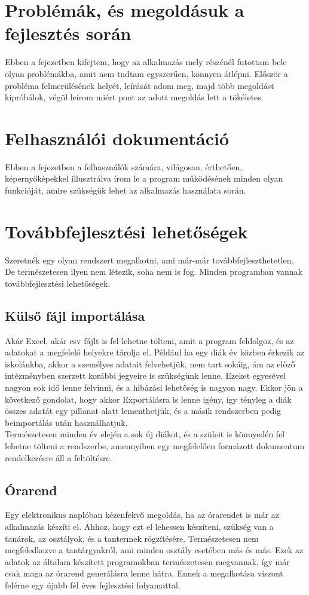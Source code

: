 \documentclass[
]{thesis-ekf}
\begin{document}
\chapter{Problémák, és megoldásuk a fejlesztés során}
Ebben a fejezetben kifejtem, hogy az alkalmazás mely részénél futottam bele olyan problémákba, amit nem tudtam egyszerűen, könnyen átlépni. Először a probléma felmerülésének helyét, leírását adom meg, majd több megoldást kipróbálok, végül leírom miért pont az adott megoldás lett a tökéletes.
\chapter{Felhasználói dokumentáció}
Ebben a fejezetben a felhasználók számára, világosan, érthetően, képernyőképekkel illusztrálva írom le a program működésének minden olyan funkcióját, amire szükségük lehet az alkalmazás használata során.
\chapter{Továbbfejlesztési lehetőségek}
Szeretnék egy olyan rendszert megalkotni, ami már-már továbbfejleszthetetlen. De természetesen ilyen nem létezik, soha nem is fog. Minden programban vannak továbbfejlesztési lehetőségek.
\section{Külső fájl importálása}
Akár Excel, akár csv fájlt is fel lehetne tölteni, amit a program feldolgoz, és az adatokat a megfelelő helyekre tárolja el. Például ha egy diák év közben érkezik az iskolánkba, akkor a személyes adatait felvehetjük, nem tart sokáig, ám az előző intézményben szerzett korábbi jegyeire is szükségünk lenne. Ezeket egyesével nagyon sok idő lenne felvinni, és a hibázási lehetőség is nagyon nagy. Ekkor jön a következő gondolat, hogy akkor Exportálásra is lenne igény, így tényleg a diák összes adatát egy pillanat alatt lementhetjük, és a másik rendszerben pedig beimportálás után használhatjuk.\\
Természetesen minden év elején a sok új diákot, és a szüleit is könnyedén fel lehetne tölteni a rendszerbe, amennyiben egy megfelelően formázott dokumentum rendelkezésre áll a feltöltésre.
\section{Órarend}
Egy elektronikus naplóban kézenfekvő megoldás, ha az órarendet is már az alkalmazás készíti el. Ahhoz, hogy ezt el lehessen készíteni, szükség van a tanárok, az osztályok, és a tantermek rögzítésére. Természetesen nem megfeledkezve a tantárgyakról, ami minden osztály esetében más és más. Ezek az adatok az általam készített programokban természetesen megvannak, így már csak maga az órarend generálásra lenne hátra. Ennek a megalkotása viszont felérne egy újabb fél éves fejlesztési folyamattal.
\end{document}

